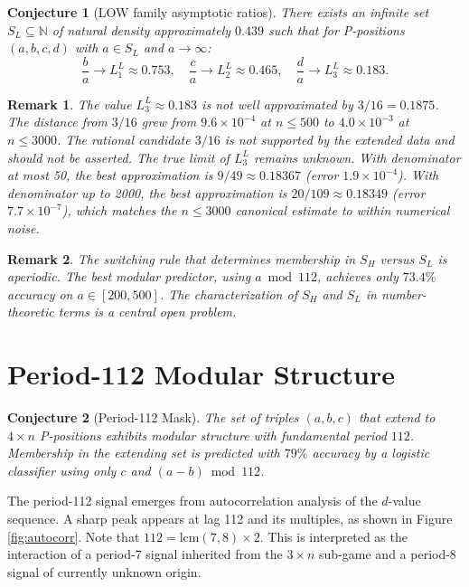 \documentclass[12pt]{article}
\newtheorem{conjecture}{Conjecture}
\newtheorem{remark}{Remark}
\begin{document}
\begin{conjecture}[LOW family asymptotic ratios]
\label{conj:low}
There exists an infinite set $S_L \subseteq \mathbb{N}$ of natural
density approximately $0.439$ such that for P-positions $(a,b,c,d)$
with $a \in S_L$ and $a \to \infty$:
\[
\frac{b}{a} \to L_1^L \approx 0.753, \quad
\frac{c}{a} \to L_2^L \approx 0.465, \quad
\frac{d}{a} \to L_3^L \approx 0.183.
\]
\end{conjecture}

\begin{remark}
The value $L_3^L \approx 0.183$ is not well approximated by $3/16
= 0.1875$. The distance from $3/16$ grew from $9.6 \times 10^{-4}$
at $n \leq 500$ to $4.0 \times 10^{-3}$ at $n \leq 3000$. The
rational candidate $3/16$ is not supported by the extended data and
should not be asserted. The true limit of $L_3^L$ remains unknown.
With denominator at most 50, the best approximation is
$9/49 \approx 0.18367$ (error $1.9 \times 10^{-4}$). With denominator
up to 2000, the best approximation is $20/109 \approx 0.18349$
(error $7.7 \times 10^{-7}$), which matches the $n \leq 3000$
canonical estimate to within numerical noise.
\end{remark}

\begin{remark}
The switching rule that determines membership in $S_H$ versus $S_L$
is aperiodic. The best modular predictor, using $a \bmod 112$,
achieves only $73.4\%$ accuracy on $a \in [200, 500]$. The
characterization of $S_H$ and $S_L$ in number-theoretic terms is
a central open problem.
\end{remark}

\section{Period-112 Modular Structure}

\begin{conjecture}[Period-112 Mask]
\label{conj:period}
The set of triples $(a,b,c)$ that extend to $4 \times n$ P-positions
exhibits modular structure with fundamental period $112$. Membership
in the extending set is predicted with $79\%$ accuracy by a logistic
classifier using only $c$ and $(a-b) \bmod 112$.
\end{conjecture}

The period-112 signal emerges from autocorrelation analysis of the
$d$-value sequence. A sharp peak appears at lag 112 and its multiples,
as shown in Figure \ref{fig:autocorr}. Note that $112 = \mathrm{lcm}(7,8)
\times 2$. This is interpreted as the interaction of a period-7 signal
inherited from the $3 \times n$ sub-game and a period-8 signal of
currently unknown origin.
\end{document}
